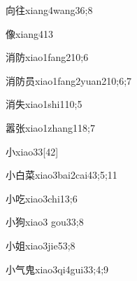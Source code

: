 \begin{verbete}{向往}{xiang4wang3}{6;8}
\end{verbete}

\begin{verbete}{像}{xiang4}{13}
\end{verbete}

\begin{verbete}{消防}{xiao1fang2}{10;6}
\end{verbete}

\begin{verbete}{消防员}{xiao1fang2yuan2}{10;6;7}
\end{verbete}

\begin{verbete}{消失}{xiao1shi1}{10;5}
\end{verbete}

\begin{verbete}{嚣张}{xiao1zhang1}{18;7}
\end{verbete}

\begin{verbete}{小}{xiao3}{3}[42]
\end{verbete}

\begin{verbete}{小白菜}{xiao3bai2cai4}{3;5;11}
\end{verbete}

\begin{verbete}{小吃}{xiao3chi1}{3;6}
\end{verbete}

\begin{verbete}{小狗}{xiao3 gou3}{3;8}
\end{verbete}

\begin{verbete}{小姐}{xiao3jie5}{3;8}
\end{verbete}

\begin{verbete}{小气鬼}{xiao3qi4gui3}{3;4;9}
\end{verbete}

